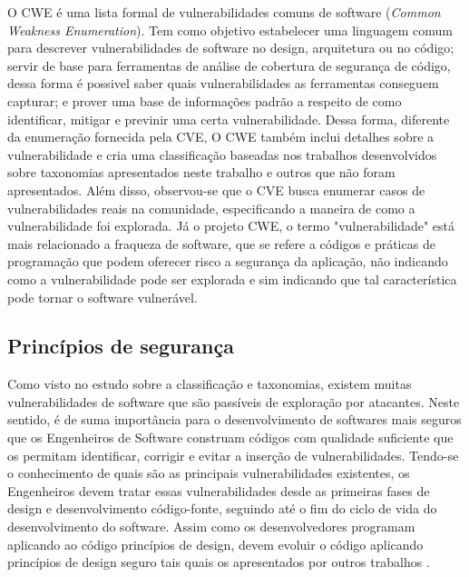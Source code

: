 %

O CWE é uma lista formal de vulnerabilidades comuns de software (\emph{Common Weakness Enumeration}). Tem como objetivo estabelecer uma linguagem comum para descrever vulnerabilidades de software no design, arquitetura ou no código; servir de base para ferramentas de análise de cobertura de segurança de código, dessa forma é possivel saber quais vulnerabilidades as ferramentas conseguem capturar; e prover uma base de informações padrão a respeito de como identificar, mitigar e previnir uma certa vulnerabilidade. Dessa forma, diferente da enumeração fornecida pela CVE, O CWE também inclui detalhes sobre a vulnerabilidade e cria uma classificação baseadas nos trabalhos desenvolvidos sobre taxonomias apresentados neste trabalho e outros que não foram apresentados. Além disso, observou-se que o CVE busca enumerar casos de vulnerabilidades reais na comunidade, especificando a maneira de como a vulnerabilidade foi explorada. Já o projeto CWE, o termo "vulnerabilidade" está mais relacionado a fraqueza de software, que se refere a códigos e práticas de programação que podem oferecer risco a segurança da aplicação, não indicando como a vulnerabilidade pode ser explorada e sim indicando que tal característica pode tornar o software vulnerável.

%

\subsection{Princípios de segurança}
\label{sec-security-principles}

Como visto no estudo sobre a classificação e taxonomias, existem muitas vulnerabilidades de software que são passíveis de exploração por atacantes. Neste sentido, é de suma importância para o desenvolvimento de softwares mais seguros que os Engenheiros de Software construam códigos com qualidade suficiente que os permitam identificar, corrigir e evitar a inserção de vulnerabilidades. Tendo-se o conhecimento de quais são as principais vulnerabilidades existentes, os Engenheiros devem tratar essas vulnerabilidades desde as primeiras fases de design e desenvolvimento código-fonte, seguindo até o fim do ciclo de vida do desenvolvimento do software. Assim como os desenvolvedores programam aplicando ao código princípios de design, devem evoluir o código aplicando princípios de design seguro tais quais os apresentados por outros trabalhos \cite{saltzer1975} \cite{bishop2003} \cite{mcgraw2002} \cite{a1lshammari2009}.

